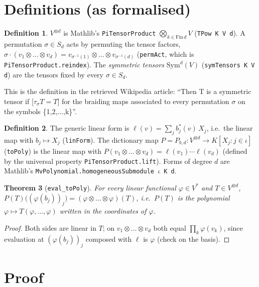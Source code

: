 \documentclass[11pt]{article}
\newtheorem{theorem}{Theorem}
\theoremstyle{definition}
\newtheorem{definition}[theorem]{Definition}
\newcommand{\lean}[1]{\texttt{#1}}
\begin{document}
\section{Definitions (as formalised)}

\begin{definition}
$V^{\otimes d}$ is Mathlib's \lean{PiTensorProduct} $\bigotimes_{k\in\mathrm{Fin}\,d}V$
(\lean{TPow K V d}). A permutation $\sigma\in S_d$ acts by permuting the tensor factors,
$\sigma\cdot(v_1\otimes\dots\otimes v_d)=v_{\sigma^{-1}(1)}\otimes\dots\otimes v_{\sigma^{-1}(d)}$
(\lean{permAct}, which is \lean{PiTensorProduct.reindex}). The \emph{symmetric tensors}
$\mathrm{Sym}^d(V)$ (\lean{symTensors K V d}) are the tensors fixed by every $\sigma\in S_d$.
\end{definition}
This is the definition in the retrieved Wikipedia article: ``Then T is a symmetric tensor if
[$\tau_\sigma T=T$] for the braiding maps associated to every permutation $\sigma$ on the symbols
\{1,2,...,k\}''.

\begin{definition}
The generic linear form is $\ell(v)=\sum_j b^*_j(v)\,X_j$, i.e.\ the linear map with
$b_j\mapsto X_j$ (\lean{linForm}). The dictionary map $P=P_{b,d}:V^{\otimes d}\to K[X_j:j\in\iota]$
(\lean{toPoly}) is the linear map with $P(v_1\otimes\dots\otimes v_d)=\ell(v_1)\cdots\ell(v_d)$
(defined by the universal property \lean{PiTensorProduct.lift}). Forms of degree $d$ are Mathlib's
\lean{MvPolynomial.homogeneousSubmodule $\iota$ K d}.
\end{definition}

\begin{theorem}[\lean{eval\_toPoly}]\label{thm:eval}
For every linear functional $\varphi\in V^*$ and $T\in V^{\otimes d}$,
$P(T)\big((\varphi(b_j))_j\big)=(\varphi\otimes\dots\otimes\varphi)(T)$, i.e.\ $P(T)$ is the
polynomial $\varphi\mapsto T(\varphi,\dots,\varphi)$ written in the coordinates of $\varphi$.
\end{theorem}
\begin{proof}
Both sides are linear in $T$; on $v_1\otimes\dots\otimes v_d$ both equal $\prod_k\varphi(v_k)$,
since evaluation at $(\varphi(b_j))_j$ composed with $\ell$ is $\varphi$ (check on the basis).
\end{proof}

\section{Proof}
\end{document}
